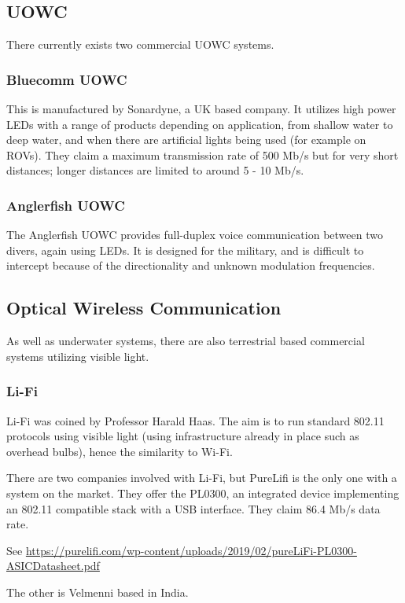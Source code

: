 \documentclass{article}
\begin{document}
\subsection{\ac{UOWC}}
There currently exists two commercial \ac{UOWC} systems.

\subsubsection{Bluecomm \ac{UOWC}}
This is manufactured by Sonardyne, a UK based company. It utilizes high power
\ac{LED}s with a range of products depending on application, from shallow water
to deep water, and when there are artificial lights being used (for example on
\ac{ROV}s). They claim a maximum transmission rate of 500 Mb/s but for very
short distances; longer distances are limited to around 5 - 10 Mb/s.

\subsubsection{Anglerfish \ac{UOWC}}
The Anglerfish \ac{UOWC} provides full-duplex voice communication between two
divers, again using \ac{LED}s. It is designed for the military, and is
difficult to intercept because of the directionality and unknown modulation
frequencies.

\subsection{Optical Wireless Communication}
As well as underwater systems, there are also terrestrial based commercial
systems utilizing visible light.

\subsubsection{Li-Fi}
Li-Fi was coined by Professor Harald Haas. The aim is to run standard 802.11
protocols using visible light (using infrastructure already in place such as
overhead bulbs), hence the similarity to Wi-Fi.

There are two companies involved with Li-Fi, but PureLifi is the only one with
a system on the market. They offer the PL0300, an integrated device
implementing an 802.11 compatible stack with a USB interface. They claim
86.4 Mb/s data rate.

See \url{https://purelifi.com/wp-content/uploads/2019/02/pureLiFi-PL0300-ASICDatasheet.pdf}

The other is Velmenni based in India.
\end{document}
